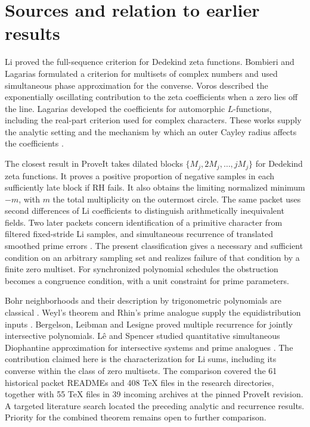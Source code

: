 \section{Sources and relation to earlier results}

Li proved the full-sequence criterion for Dedekind zeta functions.
Bombieri and Lagarias formulated a criterion for multisets of complex numbers
and used simultaneous phase approximation for the converse. Voros described
the exponentially oscillating contribution to the zeta coefficients when a
zero lies off the line. Lagarias developed the coefficients for automorphic
$L$-functions, including the real-part criterion used for complex characters.
These works supply the analytic setting and the mechanism by which an outer
Cayley radius affects the coefficients \cite{li,bl,voros,lag}.

The closest result in ProveIt takes dilated blocks
$\{M_j,2M_j,\ldots,jM_j\}$ for Dedekind zeta functions. It proves a positive
proportion of negative samples in each sufficiently late block if RH fails.
It also obtains the limiting normalized minimum $-m$, with $m$ the total
multiplicity on the outermost circle. The same packet uses second differences
of Li coefficients to distinguish arithmetically inequivalent fields.
Two later packets concern identification of a primitive character from
filtered fixed-stride Li samples, and simultaneous recurrence of translated
smoothed prime errors \cite{prior}.
The present classification gives a necessary and sufficient condition on an
arbitrary sampling set and realizes failure of that condition by a finite
zero multiset. For synchronized polynomial schedules the obstruction becomes
a congruence condition, with a unit constraint for prime parameters.

Bohr neighborhoods and their description by trigonometric polynomials are
classical \cite{bfw}. Weyl's theorem and Rhin's prime analogue supply the
equidistribution inputs \cite{weyl,rhin}. Bergelson, Leibman and Lesigne
proved multiple recurrence for jointly intersective polynomials.
L\^e and Spencer studied quantitative simultaneous Diophantine approximation
for intersective systems and prime analogues \cite{bll,ls}. The contribution
claimed here is the characterization for Li sums, including its converse
within the class of zero multisets. The comparison covered the 61 historical
packet READMEs and 408 TeX files in the research directories, together with
55 TeX files in 39 incoming archives at the pinned ProveIt revision.
A targeted literature search located the preceding analytic and recurrence
results. Priority for the combined theorem remains open to further comparison.

